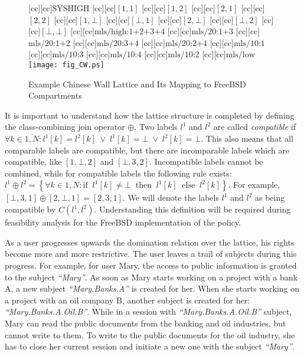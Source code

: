 \documentclass[10pt,a4paper,conference,onecolumn]{IEEEtran}
\newcommand{\KBERcode}[1]{\textsl{#1}}
\begin{document}
\begin{figure}[ht]
\centering
{}[cc][cc]{$\mbox{SYSHIGH}$}
[cc][cc]{$\left[1,1\right]$}
[cc][cc]{$\left[1,2\right]$}
[cc][cc]{$\left[2,1\right]$}
[cc][cc]{$\left[2,2\right]$}
[cc][cc]{$\left[1,\bot\right]$}
[cc][cc]{$\left[\bot,1\right]$}
[cc][cc]{$\left[2,\bot\right]$}
[cc][cc]{$\left[\bot,2\right]$}
[cc][cc]{$\left[\bot,\bot\right]$}
[cc][cc]{$\mbox{mls/high:1+2+3+4}$}
[cc][cc]{$\mbox{mls/20:1+3}$}
[cc][cc]{$\mbox{mls/20:1+2}$}
[cc][cc]{$\mbox{mls/20:3+4}$}
[cc][cc]{$\mbox{mls/20:2+4}$}
[cc][cc]{$\mbox{mls/10:1}$}
[cc][cc]{$\mbox{mls/10:3}$}
[cc][cc]{$\mbox{mls/10:4}$}
[cc][cc]{$\mbox{mls/10:2}$}
[cc][cc]{$\mbox{mls/low}$}
\texttt{[image: fig\_CW.ps]}
\caption{Example Chinese Wall Lattice and Its Mapping to FreeBSD Compartments}
\label{KBER:fig_CW}
\end{figure}


It is important to understand how the lattice structure is completed 
by defining the class-combining join operator $\oplus$. Two labels 
$l^1$ and $l^2$ are called \emph{compatible} if 
$\forall k \in\overline{1,N}: l^1[k]=l^2[k]\;\vee\;l^1[k]=\bot\;\vee\;l^2[k]=\bot.$
This also means that all comparable labels are compatible, but there are
incomparable labels which are compatible, like
$\left[1,\bot,2\right]$ and $\left[\bot,3,2\right].$ Incompatible labels cannot 
be combined, while for compatible labels the following rule exists:
$l^1\oplus l^2=\left\{\forall{}k\in \overline{1,N}: \mbox{if}\;\; l^1[k]\neq\bot \;\;\mbox{then}\;\; l^1[k] \;\;\mbox{else}\;\; l^2[k]\right\}.$
For example, $\left[\bot,3,1\right]\oplus\left[2,\bot,1\right]=\left[2,3,1\right].$
We will denote the labels $l^1$ and $l^2$ as being compatible by $\hat{C}(l^1, l^2)$.
Understanding this definition will be required during feasibility analysis
for the FreeBSD implementation of the policy.

As a user progresses upwards the domination relation over the lattice,
his rights become more and more restrictive. The user leaves a trail
of subjects during this progress. For example, for user Mary, the access
to public information is granted to the subject \KBERcode{``Mary''}. 
As soon as Mary starts working on a project with a bank A, a new 
subject \KBERcode{``Mary.Banks.A''} is created for her.
When she starts working on a project with an oil company B, another subject
is created for her: \KBERcode{``Mary.Banks.A.Oil.B''}. While in a session
with \KBERcode{``Mary.Banks.A.Oil.B''} subject, Mary can read the public 
documents from the banking and oil industries, but cannot write to them.
To write to the public documents for the oil industry,
she has to close her current session and initiate a new one with the subject
\KBERcode{``Mary''}.
\end{document}
